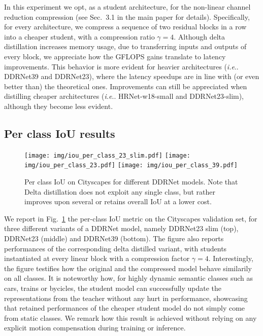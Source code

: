 \documentclass[runningheads]{llncs}
\makeatletter
\DeclareRobustCommand\onedot{\futurelet\@let@token\@onedot}
\def\@onedot{\ifx\@let@token.\else.\null\fi\xspace}
\def\ie{\emph{i.e}\onedot} \def\Ie{\emph{I.e}\onedot}
\makeatother
\begin{document}
In this experiment we opt, as a student architecture, for the non-linear channel reduction compression (see Sec.~3.1 in the main paper for details).
Specifically, for every architecture, we compress a sequence of two residual blocks in a row into a cheaper student, with a compression ratio $\gamma=4$.
Although delta distillation increases memory usage, due to transferring inputs and outputs of every block, we appreciate how the GFLOPS gains translate to latency improvements.
This behavior is more evident for heavier architectures (\ie DDRNet39 and DDRNet23), where the latency speedups are in line with (or even better than) the theoretical ones.
Improvements can still be appreciated when distilling cheaper architectures (\ie HRNet-w18-small and DDRNet23-slim), although they become less evident. 
\subsection{Per class IoU results}
\begin{figure}
    \centering
    \texttt{[image: img/iou\_per\_class\_23\_slim.pdf]}
    \texttt{[image: img/iou\_per\_class\_23.pdf]}
    \texttt{[image: img/iou\_per\_class\_39.pdf]}
    \caption{Per class IoU on Cityscapes for different DDRNet models. Note that Delta distillation does not exploit any single class, but rather improves upon several or retains overall IoU at a lower cost.}
    \label{fig:per_class_iou}
\end{figure} We report in Fig.~\ref{fig:per_class_iou} the per-class IoU metric on the Cityscapes validation set, for three different variants of a DDRNet model, namely DDRNet23 slim (top), DDRNet23 (middle) and DDRNet39 (bottom).
The figure also reports performances of the corresponding delta distilled variant, with students instantiated at every linear block with a compression factor $\gamma=4$.
Interestingly, the figure testifies how the original and the compressed model behave similarily on all classes.
It is noteworthy how, for highly dynamic semantic classes such as cars, trains or bycicles, the student model can successfully update the representations from the teacher without any hurt in performance, showcasing that retained performances of the cheaper student model do not simply come from static classes.
We remark how this result is achieved without relying on any explicit motion compensation during training or inference.
\end{document}
